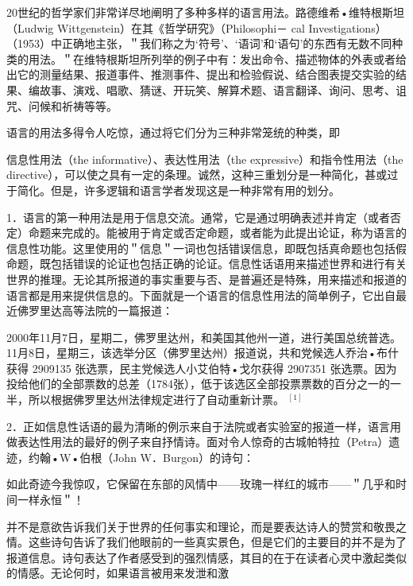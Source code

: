 20世纪的哲学家们非常详尽地阐明了多种多样的语言用法。路德维希•维特根斯坦（Ludwig Wittgenstein）在其《哲学研究》（Philosophi－ cal Investigations）（1953）中正确地主张，＂我们称之为‘符号’、‘语词’和‘语句’的东西有无数不同种类的用法。＂在维特根斯坦所列举的例子中有：发出命令、描述物体的外表或者给出它的测量结果、报道事件、推测事件、提出和检验假说、结合图表提交实验的结果、编故事、演戏、唱歌、猜谜、开玩笑、解算术题、语言翻译、询问、思考、诅咒、问候和祈祷等等。

语言的用法多得令人吃惊，通过将它们分为三种非常笼统的种类，即

信息性用法（the informative）、表达性用法（the expressive）和指令性用法（the directive），可以使之具有一定的条理。诚然，这种三重划分是一种简化，甚或过于简化。但是，许多逻辑和语言学者发现这是一种非常有用的划分。

1．语言的第一种用法是用于信息交流。通常，它是通过明确表述并肯定（或者否定）命题来完成的。能被用于肯定或否定命题，或者能为此提出论证，称为语言的信息性功能。这里使用的＂信息＂一词也包括错误信息，即既包括真命题也包括假命题，既包括错误的论证也包括正确的论证。信息性话语用来描述世界和进行有关世界的推理。无论其所报道的事实重要与否、是普遍还是特殊，用来描述和报道的语言都是用来提供信息的。下面就是一个语言的信息性用法的简单例子，它出自最近佛罗里达高等法院的一篇报道：

\begin{displayquote}
2000年11月7日，星期二，佛罗里达州，和美国其他州一道，进行美国总统普选。11月8日，星期三，该选举分区（佛罗里达州）报道说，共和党候选人乔治•布什获得 2909135 张选票，民主党候选人小艾伯特•戈尔获得 2907351 张选票。因为投给他们的全部票数的总差（1784张），低于该选区全部投票票数的百分之一的一半，所以根据佛罗里达州法律规定进行了自动重新计票。 ${ }^{[1]}$
\end{displayquote}

2．正如信息性话语的最为清晰的例示来自于法院或者实验室的报道一样，语言用做表达性用法的最好的例子来自抒情诗。面对令人惊奇的古城帕特拉（Petra）遗迹，约翰•W•伯根（John W．Burgon）的诗句：

\begin{displayquote}
如此奇迹今我惊叹，它保留在东部的风情中——玫瑰一样红的城市——＂几乎和时间一样永恒＂！
\end{displayquote}

并不是意欲告诉我们关于世界的任何事实和理论，而是要表达诗人的赞赏和敬畏之情。这些诗句告诉了我们他眼前的一些真实景色，但是它们的主要目的并不是为了报道信息。诗句表达了作者感受到的强烈情感，其目的在于在读者心灵中激起类似的情感。无论何时，如果语言被用来发泄和激

